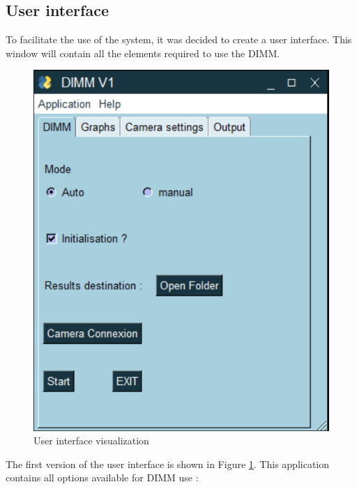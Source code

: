 \subsection{User interface}
To facilitate the use of the system, it was decided to create a user interface.
This window will contain all the elements required to use the \Gls{DIMM}.
\begin{figure}[H]
    \centering
    \includegraphics[scale=0.85]{assets/figures/Software/GUI1.png}
    \caption{User interface visualization}
    \label{fig:Soft_GUI}
\end{figure}
The first version of the user interface is shown in Figure \ref{fig:Soft_GUI}.
This application contains all options available for \Gls{DIMM} use :
